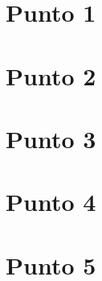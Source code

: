 \documentclass{article}
\begin{document}
\section*{Punto 1}


\pagebreak

\section*{Punto 2}


\pagebreak

\section*{Punto 3}


\pagebreak

\section*{Punto 4}


\pagebreak

\section*{Punto 5}

\end{document}
